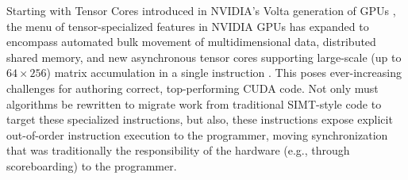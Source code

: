 
Starting with Tensor Cores introduced in NVIDIA's Volta generation of GPUs \cite{V100}, the menu of tensor-specialized features in NVIDIA GPUs has expanded to encompass automated bulk movement of multidimensional data, distributed shared memory, and new asynchronous tensor cores supporting large-scale (up to $64 \times 256$) matrix accumulation in a single instruction \cite{ptx}.
This poses ever-increasing challenges for authoring correct, top-performing CUDA code.
Not only must algorithms be rewritten to migrate work from traditional SIMT-style code to target these specialized instructions, but also, these instructions expose explicit out-of-order instruction execution to the programmer, moving synchronization that was traditionally the responsibility of the hardware (e.g., through scoreboarding) to the programmer.

